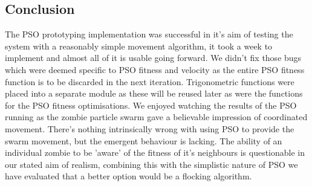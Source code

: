 \subsection{Conclusion}
The PSO prototyping implementation was successful in it's aim of testing the system with a reasonably simple movement algorithm, it took a week to implement and almost all of it is usable going forward. We didn't fix those bugs which were deemed specific to PSO fitness and velocity as the entire PSO fitness function is to be discarded in the next iteration. Trigonometric functions were placed into a separate module as these will be reused later as were the functions for the PSO fitness optimisations. We enjoyed watching the results of the PSO running as the zombie particle swarm gave a believable impression of coordinated movement. There's nothing intrinsically wrong with using PSO to provide the swarm movement, but the emergent behaviour is lacking. The ability of an individual zombie to be 'aware' of the fitness of it's neighbours is questionable in our stated aim of realism, combining this with the simplistic nature of PSO we have evaluated that a better option would be a flocking algorithm.

\clearpage
\endinput
